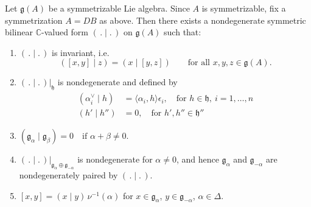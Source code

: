\documentclass[12pt]{article}
\begin{document}
\begin{theorem}\label{thm:invariant-bilinear-form}
    Let $\mathfrak{g}(A)$ be a symmetrizable Lie algebra. Since $A$ is symmetrizable, fix a symmetrization $A = DB$ as above. Then there exists a nondegenerate symmetric bilinear $\mathbb{C}$-valued form
    $(\,.\mid.\,)$ on $\mathfrak{g}(A)$ such that:
    \begin{enumerate}[label=\alph*)]
        \item $(\,.\mid.\,)$ is invariant, i.e.
              \[
                  ([x,y]\mid z) = (x \mid [y,z])
                  \qquad \text{for all } x,y,z \in \mathfrak{g}(A).
              \]
        \item $(\,.\mid.\,)|_{\mathfrak{h}}$ is nondegenerate and defined by
              \begin{align*}
                  (\alpha_i^\vee \mid h) & = \langle \alpha_i, h \rangle \epsilon_i, \quad \text{for } h \in \mathfrak{h},\ i = 1,\ldots,n \\
                  (h' \mid h'')          & = 0, \quad \text{for } h', h'' \in \mathfrak{h}''
              \end{align*}
        \item $(\mathfrak{g}_\alpha \mid \mathfrak{g}_\beta) = 0
                  \quad \text{if } \alpha+\beta \neq 0$.
        \item $(\,.\mid.\,)|_{\mathfrak{g}_\alpha \oplus \mathfrak{g}_{-\alpha}}$
              is nondegenerate for $\alpha \neq 0$, and hence
              $\mathfrak{g}_\alpha$ and $\mathfrak{g}_{-\alpha}$ are
              nondegenerately paired by $(\,.\mid.\,)$.
        \item $[x,y] = (x \mid y)\,\nu^{-1}(\alpha)$
              for $x \in \mathfrak{g}_\alpha$, $y \in \mathfrak{g}_{-\alpha}$,
              $\alpha \in \Delta$.
    \end{enumerate}
\end{theorem}
\end{document}
